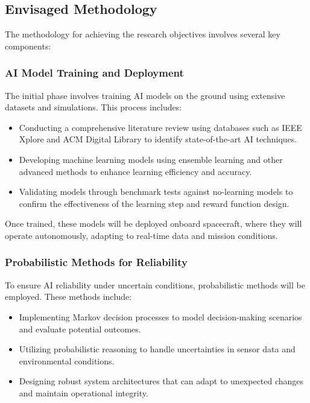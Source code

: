 \documentclass[a4paper, 11pt]{article}
\begin{document}
\subsection{Envisaged Methodology}

The methodology for achieving the research objectives involves several key components:

\subsubsection{AI Model Training and Deployment}

The initial phase involves training AI models on the ground using extensive datasets and simulations. This process includes:

\begin{itemize}
    \item Conducting a comprehensive literature review using databases such as IEEE Xplore and ACM Digital Library to identify state-of-the-art AI techniques.
    \item Developing machine learning models using ensemble learning and other advanced methods to enhance learning efficiency and accuracy.
    \item Validating models through benchmark tests against no-learning models to confirm the effectiveness of the learning step and reward function design.
\end{itemize}

Once trained, these models will be deployed onboard spacecraft, where they will operate autonomously, adapting to real-time data and mission conditions.

\subsubsection{Probabilistic Methods for Reliability}

To ensure AI reliability under uncertain conditions, probabilistic methods will be employed. These methods include:

\begin{itemize}
    \item Implementing Markov decision processes to model decision-making scenarios and evaluate potential outcomes.
    \item Utilizing probabilistic reasoning to handle uncertainties in sensor data and environmental conditions.
    \item Designing robust system architectures that can adapt to unexpected changes and maintain operational integrity.
\end{itemize}
\end{document}
